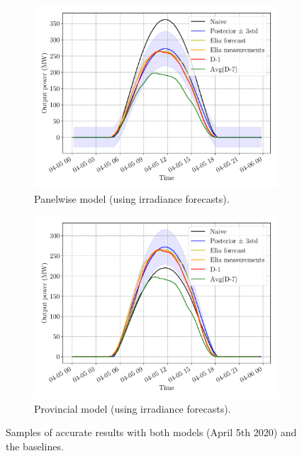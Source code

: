 \documentclass[a4paper, 12pt]{article}
\begin{document}
\begin{figure}[H]
	\centering
	\begin{subfigure}{0.48\textwidth}
		\centering
		\includegraphics[width=\textwidth]{resources/pdf/solar_panelwise (START_FOR 05-04-2020).pdf}
		\caption{Panelwise model (using irradiance forecasts).}
		\label{fig:panelwise_good_2}
	\end{subfigure}
	\hspace{0.5em}
	\begin{subfigure}{0.48\textwidth}
		\centering
		\includegraphics[width=\textwidth]{resources/pdf/solar_provincial (START_FOR 05-04-2020).pdf}
		\caption{Provincial model (using irradiance forecasts).}
		\label{fig:provincial_good_2}
	\end{subfigure}
	\caption{Samples of accurate results with both models (April 5th 2020) and the baselines.}
	\label{fig:good_results_april_5th}
\end{figure}
\end{document}
